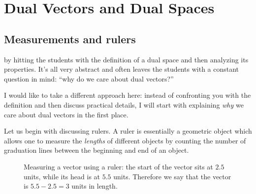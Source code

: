 \section{Dual Vectors and Dual Spaces}

\subsection{Measurements and rulers}
 by hitting the students with the definition of a dual space and then analyzing its properties. It's all very abstract and often leaves the students with a constant question in mind: \enquote{why do we care about dual vectors?}

I would like to take a different approach here: instead of confronting you with the definition and then discuss practical details, I will start with explaining \textit{why} we care about dual vectors in the first place.

Let us begin with discussing rulers. A ruler is essentially a geometric object which allows one to measure the \textit{lengths} of different objects by counting the number of graduation lines between the beginning and end of an object.

\begin{figure}
    \begin{center}
    \end{center}
    \caption{Measuring a vector using a ruler: the start of the vector sits at $2.5$ units, while its head is at $5.5$ units. Therefore we say that the vector is $5.5-2.5=3$ units in length.}
    \label{fig:ruler_measure}
\end{figure}
